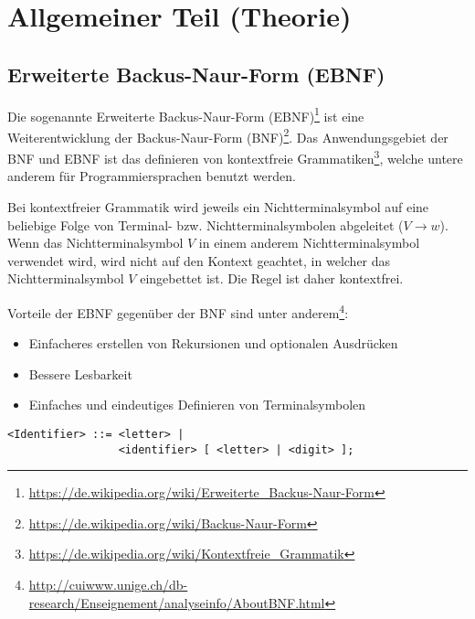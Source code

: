 

\section{Allgemeiner Teil (Theorie)}

\subsection{Erweiterte Backus-Naur-Form (EBNF)}

Die sogenannte Erweiterte Backus-Naur-Form (EBNF)\footnote{\url{https://de.wikipedia.org/wiki/Erweiterte_Backus-Naur-Form}} ist eine Weiterentwicklung der Backus-Naur-Form (BNF)\footnote{\url{https://de.wikipedia.org/wiki/Backus-Naur-Form}}. Das Anwendungsgebiet der BNF und EBNF ist das definieren von  kontextfreie Grammatiken\footnote{\url{https://de.wikipedia.org/wiki/Kontextfreie_Grammatik}}, welche untere anderem f\"ur Programmiersprachen benutzt werden.

Bei kontextfreier Grammatik wird jeweils ein Nichtterminalsymbol auf eine beliebige Folge von Terminal- bzw. Nichtterminalsymbolen abgeleitet ($V \rightarrow w$). Wenn das Nichtterminalsymbol $V$ in einem anderem Nichtterminalsymbol verwendet wird, wird nicht auf den Kontext geachtet, in welcher das Nichtterminalsymbol $V$ eingebettet ist. Die Regel ist daher kontextfrei.

Vorteile der EBNF gegen\"uber der BNF sind unter anderem\footnote{\url{http://cuiwww.unige.ch/db-research/Enseignement/analyseinfo/AboutBNF.html}}:

\begin{itemize}
  \item Einfacheres erstellen von Rekursionen und optionalen Ausdr\"ucken
  \item Bessere Lesbarkeit
  \item Einfaches und eindeutiges Definieren von Terminalsymbolen
\end{itemize}


\begin{lstlisting}[language=EBNF]
<Identifier> ::= <letter> |
                 <identifier> [ <letter> | <digit> ];
\end{lstlisting}

